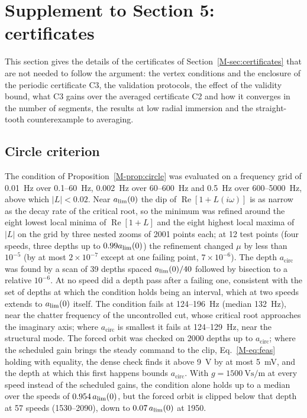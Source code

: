 \section{Supplement to Section 5: certificates}\label{supp:cert}

This section gives the details of the certificates of Section~\ref{M-sec:certificates} that are not needed to follow the argument: the vertex conditions and the enclosure of the periodic certificate C3, the validation protocols, the effect of the validity bound, what C3 gains over the averaged certificate C2 and how it converges in the number of segments, the results at low radial immersion and the straight-tooth counterexample to averaging.

\subsection{Circle criterion}\label{supp:circle}

The condition of Proposition~\ref{M-prop:circle} was evaluated on a frequency grid of \SI{0.01}{\hertz} over 0.1--\SI{60}{\hertz}, \SI{0.002}{\hertz} over 60--\SI{600}{\hertz} and \SI{0.5}{\hertz} over 600--\SI{5000}{\hertz}, above which $\lvert L\rvert<0.02$. Near $a_{\lim}(0)$ the dip of $\operatorname{Re}[1+L(i\omega)]$ is as narrow as the decay rate of the critical root, so the minimum was refined around the eight lowest local minima of $\operatorname{Re}[1+L]$ and the eight highest local maxima of $\lvert L\rvert$ on the grid by three nested zooms of 2001 points each; at 12 test points (four speeds, three depths up to $0.99a_{\lim}(0)$) the refinement changed $\mu$ by less than $10^{-5}$ (by at most $2\times10^{-7}$ except at one failing point, $7\times10^{-6}$). The depth $a_{\mathrm{circ}}$ was found by a scan of 39 depths spaced $a_{\lim}(0)/40$ followed by bisection to a relative $10^{-6}$. At no speed did a depth pass after a failing one, consistent with the set of depths at which the condition holds being an interval, which at two speeds extends to $a_{\lim}(0)$ itself. The condition fails at 124--\SI{196}{\hertz} (median \SI{132}{\hertz}), near the chatter frequency of the uncontrolled cut, whose critical root approaches the imaginary axis; where $a_{\mathrm{circ}}$ is smallest it fails at 124--\SI{129}{\hertz}, near the structural mode. The forced orbit was checked on 2000 depths up to $a_{\mathrm{circ}}$; where the scheduled gain brings the steady command to the clip, Eq.~\eqref{M-eq:feas} holding with equality, the dense check finds it above \SI{9}{\volt} by at most \SI{5}{\milli\volt}, and the depth at which this first happens bounds $a_{\mathrm{circ}}$. With $g=\SI{1500}{\volt\second\per\metre}$ at every speed instead of the scheduled gains, the condition alone holds up to a median over the speeds of $0.954\,a_{\lim}(0)$, but the forced orbit is clipped below that depth at 57 speeds (1530--\SI{2090}{\rpm}), down to $0.07\,a_{\lim}(0)$ at \SI{1950}{\rpm}.

